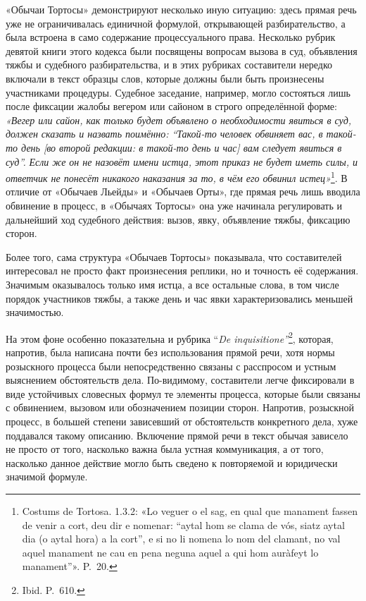 «Обычаи Тортосы» демонстрируют несколько иную ситуацию: здесь прямая речь уже не ограничивалась единичной формулой, открывающей разбирательство, а была встроена в само содержание процессуального права. Несколько рубрик девятой книги этого кодекса были посвящены вопросам вызова в суд, объявления тяжбы и судебного разбирательства, и в этих рубриках составители нередко включали в текст образцы слов, которые должны были быть произнесены участниками процедуры. Судебное заседание, например, могло состояться лишь после фиксации жалобы вегером или сайоном в строго определённой форме: \emph{«Вегер или сайон, как только будет объявлено о необходимости явиться в суд, должен сказать и назвать поимённо: “Такой-то человек обвиняет вас, в такой-то день [во второй редакции: в такой-то день и час] вам следует явиться в суд”}\emph{.}\emph{ }\emph{Е}\emph{сли же он не назовёт имени истца, этот приказ не будет иметь силы}\emph{, и ответчик не понесёт никакого наказания за то, в чём его обвинил истец»}\footnote{Costums de Tortosa. 1.3.2: «Lo veguer o el sag, en qual que manament fassen de venir a cort, deu dir e nomenar: “aytal hom se clama de vós, siatz aytal dia (o aytal hora) a la cort”, e si no li nomena lo nom del clamant, no val aquel manament ne cau en pena neguna aquel a qui hom auràfeyt lo manament”». P.~20.}. В отличие от «Обычаев Льейды» и «Обычаев Орты», где прямая речь лишь вводила обвинение в процесс, в «Обычаях Тортосы» она уже начинала регулировать и дальнейший ход судебного действия: вызов, явку, объявление тяжбы, фиксацию сторон.

Более того, сама структура «Обычаев Тортосы» показывала, что составителей интересовал не просто факт произнесения реплики, но и точность её содержания. Значимым оказывалось только имя истца, а все остальные слова, в том числе порядок участников тяжбы, а также день и час явки характеризовались меньшей значимостью.

На этом фоне особенно показательна и рубрика “\emph{De inquisitione”}\footnote{Ibid. P.~610.}, которая, напротив, была написана почти без использования прямой речи, хотя нормы розыскного процесса были непосредственно связаны с расспросом и устным выяснением обстоятельств дела. По-видимому, составители легче фиксировали в виде устойчивых словесных формул те элементы процесса, которые были связаны с обвинением, вызовом или обозначением позиции сторон. Напротив, розыскной процесс, в большей степени зависевший от обстоятельств конкретного дела, хуже поддавался такому описанию. Включение прямой речи в текст обычая зависело не просто от того, насколько важна была устная коммуникация, а от того, насколько данное действие могло быть сведено к повторяемой и юридически значимой формуле.

